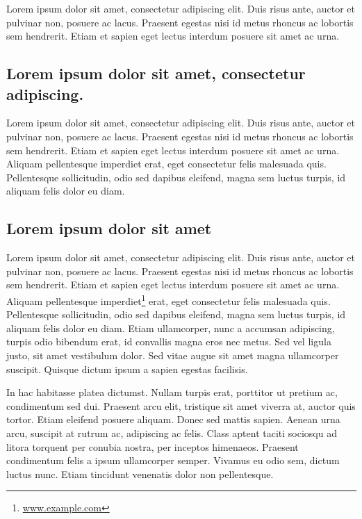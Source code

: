 Lorem ipsum dolor sit amet, consectetur adipiscing elit. Duis risus ante, auctor et pulvinar non, posuere ac lacus. Praesent egestas nisi id metus rhoncus ac lobortis sem hendrerit. Etiam et sapien eget lectus interdum posuere sit amet ac urna.

\subsection{Lorem ipsum dolor sit amet, consectetur adipiscing.}
Lorem ipsum dolor sit amet, consectetur adipiscing elit. Duis risus ante, auctor et pulvinar non, posuere ac lacus. Praesent egestas nisi id metus rhoncus ac lobortis sem hendrerit. Etiam et sapien eget lectus interdum posuere sit amet ac urna. Aliquam pellentesque imperdiet erat, eget consectetur felis malesuada quis. Pellentesque sollicitudin, odio sed dapibus eleifend, magna sem luctus turpis, id aliquam felis dolor eu diam.

\subsection{Lorem ipsum dolor sit amet}
Lorem ipsum dolor sit amet, consectetur adipiscing elit. Duis risus ante, auctor et pulvinar non, posuere ac lacus. Praesent egestas nisi id metus rhoncus ac lobortis sem hendrerit. Etiam et sapien eget lectus interdum posuere sit amet ac urna. Aliquam pellentesque imperdiet\footnote{\url{www.example.com}} erat, eget consectetur felis malesuada quis. Pellentesque sollicitudin, odio sed dapibus eleifend, magna sem luctus turpis, id aliquam felis dolor eu diam. Etiam ullamcorper, nunc a accumsan adipiscing, turpis odio bibendum erat, id convallis magna eros nec metus. Sed vel ligula justo, sit amet vestibulum dolor. Sed vitae augue sit amet magna ullamcorper suscipit. Quisque dictum ipsum a sapien egestas facilisis.

In hac habitasse platea dictumst. Nullam turpis erat, porttitor ut pretium ac, condimentum sed dui. Praesent arcu elit, tristique sit amet viverra at, auctor quis tortor. Etiam eleifend posuere aliquam. Donec sed mattis sapien. Aenean urna arcu, suscipit at rutrum ac, adipiscing ac felis. Class aptent taciti sociosqu ad litora torquent per conubia nostra, per inceptos himenaeos. Praesent condimentum felis a ipsum ullamcorper semper. Vivamus eu odio sem, dictum luctus nunc. Etiam tincidunt venenatis dolor non pellentesque.

